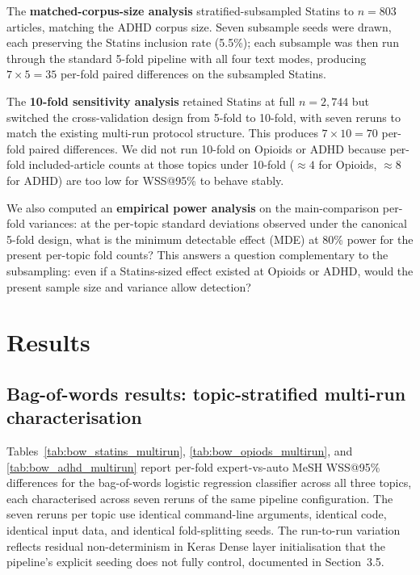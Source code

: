 \documentclass[11pt,a4paper]{article}
\begin{document}
The \textbf{matched-corpus-size analysis} stratified-subsampled Statins to $n=803$ articles, matching the ADHD corpus size. Seven subsample seeds were drawn, each preserving the Statins inclusion rate (5.5\%); each subsample was then run through the standard 5-fold pipeline with all four text modes, producing $7 \times 5 = 35$ per-fold paired differences on the subsampled Statins.

The \textbf{10-fold sensitivity analysis} retained Statins at full $n = 2{,}744$ but switched the cross-validation design from 5-fold to 10-fold, with seven reruns to match the existing multi-run protocol structure. This produces $7 \times 10 = 70$ per-fold paired differences. We did not run 10-fold on Opioids or ADHD because per-fold included-article counts at those topics under 10-fold ($\approx 4$ for Opioids, $\approx 8$ for ADHD) are too low for WSS@95\% to behave stably.

We also computed an \textbf{empirical power analysis} on the main-comparison per-fold variances: at the per-topic standard deviations observed under the canonical 5-fold design, what is the minimum detectable effect (MDE) at 80\% power for the present per-topic fold counts? This answers a question complementary to the subsampling: even if a Statins-sized effect existed at Opioids or ADHD, would the present sample size and variance allow detection?

\section{Results}

\subsection{Bag-of-words results: topic-stratified multi-run characterisation}

Tables~\ref{tab:bow_statins_multirun}, \ref{tab:bow_opiods_multirun}, and \ref{tab:bow_adhd_multirun} report per-fold expert-vs-auto MeSH WSS@95\% differences for the bag-of-words logistic regression classifier across all three topics, each characterised across seven reruns of the same pipeline configuration. The seven reruns per topic use identical command-line arguments, identical code, identical input data, and identical fold-splitting seeds. The run-to-run variation reflects residual non-determinism in Keras Dense layer initialisation that the pipeline's explicit seeding does not fully control, documented in Section~3.5.
\end{document}

